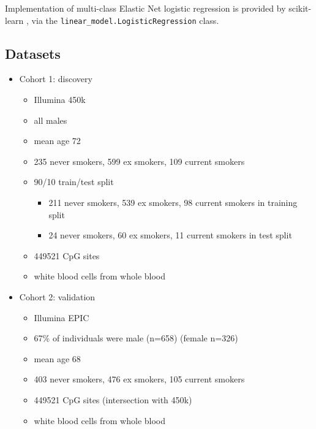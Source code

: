 \documentclass{article}
\begin{document}
Implementation of multi-class Elastic Net logistic regression is provided by scikit-learn \cite{scikit-learn}, via the \verb|linear_model.LogisticRegression| class.

\subsection{Datasets}
\begin{itemize}
    \item Cohort 1: discovery
          \begin{itemize}
              \item Illumina 450k
              \item all males
              \item mean age 72
              \item 235 never smokers, 599 ex smokers, 109 current smokers
              \item 90/10 train/test split
              \begin{itemize}
                \item 211 never smokers, 539 ex smokers, 98 current smokers in training split
                \item 24 never smokers, 60 ex smokers, 11 current smokers in test split
              \end{itemize}
              \item \num{449521} CpG sites
              \item white blood cells from whole blood
          \end{itemize}
    \item Cohort 2: validation
          \begin{itemize}
              \item Illumina EPIC
              \item 67\% of individuals were male (n=658) (female n=326)
              \item mean age 68
              \item 403 never smokers, 476 ex smokers, 105 current smokers
              \item \num{449521} CpG sites (intersection with 450k)
              \item white blood cells from whole blood
          \end{itemize}
\end{itemize}
\end{document}
